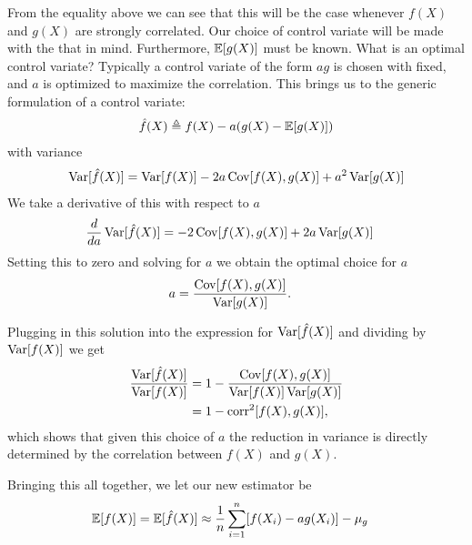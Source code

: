   From the equality above we can see that this will be the case whenever $f(X)$ and $g(X)$ are strongly correlated. Our choice of control variate will be made with the that in mind. Furthermore, $\operatorname{\mathbb{E}} [ g(X) ]$ must be known. What is an optimal control variate? Typically a control variate of the form $ag$ is chosen with fixed, and $a$ is optimized to maximize the correlation. This brings us to the generic formulation of a control variate:
  \begin{align*}
      \hat{f}(X) \triangleq f(X) - a(g(X) - \operatorname{\mathbb{E}} [ g(X) ])
  \end{align*}
  with variance
  \begin{align*}
    \operatorname{Var} [ \hat{f}(X) ] = \operatorname{Var} [ f(X) ] - 2a  \operatorname{Cov} [ f(X), g(X) ] + a^2 \operatorname{Var} [ g(X) ]
  \end{align*}
  We take a derivative of this with respect to $a$
  \begin{align*}
      \frac{d}{d a}\operatorname{Var} [ \hat{f}(X) ] &= - 2  \operatorname{Cov} [ f(X), g(X) ] + 2a \operatorname{Var} [ g(X) ]
  \end{align*}
  Setting this to zero and solving for $a$ we obtain the optimal choice for $a$
  \begin{align}
  \label{eq:cv-scale}
    a &= \frac{ \operatorname{Cov} [ f(X), g(X) ]}{ \operatorname{Var} [ g(X) ]}.
  \end{align}

  Plugging in this solution into the expression for $\operatorname{Var} [ \hat{f}(X) ]$ and dividing by $\operatorname{Var} [ f(X) ]$ we get
  \begin{align}
  \label{eq:var-red}
    \frac{\operatorname{Var} [ \hat{f}(X) ]}{\operatorname{Var} [ f(X) ]}
      &= 1 - \frac{\operatorname{Cov}[ f(X), g(X) ]}{ \operatorname{Var} [ f(X) ]  \operatorname{Var} [ g(X) ]} \\
      &= 1 - \operatorname{corr}^2 [ f(X), g(X) ],
  \end{align}
  which shows that given this choice of $a$ the reduction in variance is directly determined by the correlation between $f(X)$ and $g(X)$.

  Bringing this all together, we let our new estimator be
  \begin{align*}
    \operatorname{\mathbb{E}} [ f(X) ]
      &= \operatorname{\mathbb{E}} [ \hat{f}(X) ] \approx \frac{1}{n} \sum_{i=1}^n [ f(X_i) - ag(X_i) ] - \mu_{g}
  \end{align*}

